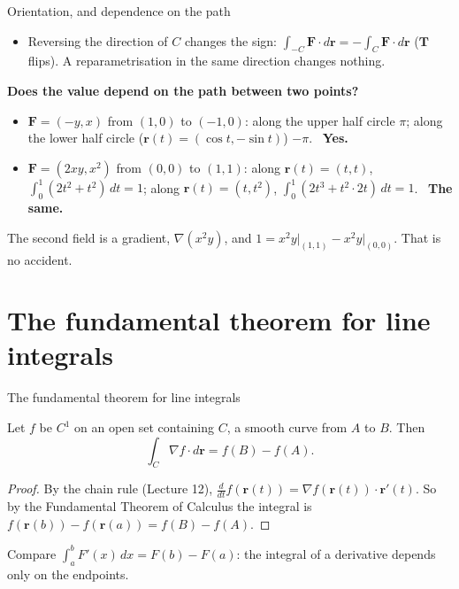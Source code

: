 \documentclass[10pt]{wosm-slides}
\newcommand{\vr}{\mathbf{r}}
\newcommand{\vF}{\mathbf{F}}
\newcommand{\vT}{\mathbf{T}}
\begin{document}
\begin{frame}{Orientation, and dependence on the path}
  \begin{itemize}
    \item Reversing the direction of $C$ changes the sign: $\int_{-C} \vF \cdot d\vr = -\int_C \vF \cdot d\vr$
      ($\vT$ flips). A reparametrisation in the same direction changes nothing.
  \end{itemize}
  \pause
  \textbf{Does the value depend on the path between two points?}
  \begin{itemize}
    \item $\vF = (-y, x)$ from $(1, 0)$ to $(-1, 0)$: along the upper half circle $\pi$; along the lower
      half circle ($\vr(t) = (\cos t, -\sin t)$) $-\pi$. \ \textbf{Yes.}
    \pause
    \item $\vF = (2xy, x^2)$ from $(0, 0)$ to $(1, 1)$: along $\vr(t) = (t, t)$,
      $\int_0^1 (2t^2 + t^2)\, dt = 1$; along $\vr(t) = (t, t^2)$, $\int_0^1 (2t^3 + t^2 \cdot 2t)\, dt = 1$.
      \ \textbf{The same.}
  \end{itemize}
  \pause
  {\small The second field is a gradient, $\nabla(x^2 y)$, and $1 = x^2y\big|_{(1,1)} - x^2y\big|_{(0,0)}$.
  That is no accident.\par}
\end{frame}

\section{The fundamental theorem for line integrals}

\begin{frame}{The fundamental theorem for line integrals}
  \begin{theorem}
    Let $f$ be $C^1$ on an open set containing $C$, a smooth curve from $A$ to $B$. Then
    \[ \int_C \nabla f \cdot d\vr = f(B) - f(A) . \]
  \end{theorem}
  \pause
  \begin{proof}
    By the chain rule (Lecture 12), $\frac{d}{dt} f(\vr(t)) = \nabla f(\vr(t)) \cdot \vr'(t)$. So by the
    Fundamental Theorem of Calculus the integral is $f(\vr(b)) - f(\vr(a)) = f(B) - f(A)$.
  \end{proof}
  \pause
  {\small Compare $\int_a^b F'(x)\, dx = F(b) - F(a)$: the integral of a derivative depends only on the
  endpoints.\par}
\end{frame}
\end{document}

